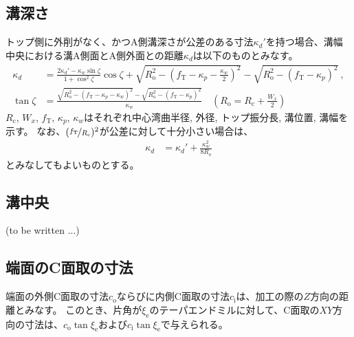 \subsection{溝深さ}
トップ側に外削がなく、かつA側溝深さが公差のある寸法$\kappa_d'$を持つ場合、溝幅中央における溝A側面とA側外面との距離$\kappa_d$は以下のものとみなす。
\begin{align*}
  \kappa_d
  &= \frac{2\kappa_d'-\kappa_w\sin\zeta}{1+\cos^2\zeta}\cos\zeta
     +\sqrt{R_\mathrm o^2-\left(f_\mathrm T-\kappa_p-\frac{\kappa_w}2\right)^{\!2}}
     -\sqrt{R_\mathrm o^2-\left(f_\mathrm T-\kappa_p\right)^2}\ ,\\
  \tan\zeta
  &= \frac{\sqrt{R_\mathrm o^2-\left(f_\mathrm T-\kappa_p-\kappa_w\right)^2}
           -\sqrt{R_\mathrm o^2-\left(f_\mathrm T-\kappa_p\right)^2}}
          {\kappa_w}\quad
     \left(R_\mathrm o = R_\mathrm c+\frac{W_x}2\right)
\end{align*}
$R_\mathrm c$, $W_x$, $f_\mathrm T$, $\kappa_p$, $\kappa_w$はそれぞれ中心湾曲半径, 外径, トップ振分長, 溝位置, 溝幅を示す。
なお、$(\nicefrac{f_\mathrm T}{R_\mathrm c})^2$が公差に対して十分小さい場合は、
\begin{align*}
  \kappa_d
  &= \kappa_d'+\frac{\kappa_w^2}{8R_\mathrm o}
\end{align*}
とみなしてもよいものとする。


\subsection{溝中央\TBW}
(to be written ...)



\clearpage


\subsection{端面のC面取の寸法}
端面の外側C面取の寸法$c_\mathrm o$ならびに内側C面取の寸法$c_\mathrm i$は、加工の際の$Z$方向の距離とみなす。
このとき、片角が$\xi_\mathrm e$のテーパエンドミルに対して、C面取の$XY$方向の寸法は、$c_\mathrm o\tan\xi_\mathrm e$および$c_\mathrm i\tan\xi_\mathrm e$で与えられる。


